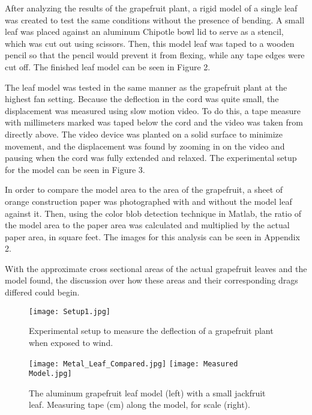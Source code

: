 	After analyzing the results of the grapefruit plant, a rigid model of a single leaf was created to test the same conditions without the presence of bending. A small leaf was placed against an aluminum Chipotle bowl lid to serve as a stencil, which was cut out using scissors. Then, this model leaf was taped to a wooden pencil so that the pencil would prevent it from flexing, while any tape edges were cut off. The finished leaf model can be seen in 
Figure 2.

	The leaf model was tested in the same manner as the grapefruit plant at the highest fan setting. Because the deflection in the cord was quite small, the displacement was measured using slow motion video. To do this, a tape measure with millimeters marked was taped below the cord and the video was taken from directly above. The video device was planted on a solid surface to minimize movement, and the displacement was found by zooming in on the video and pausing when the cord was fully extended and relaxed. The experimental setup for the model can be seen in Figure 3.

	In order to compare the model area to the area of the grapefruit, a sheet of orange construction paper was photographed with and without the model leaf against it. Then, using the color blob detection technique in Matlab, the ratio of the model area to the paper area was calculated and multiplied by the actual paper area, in square feet. The images for this analysis can be seen in Appendix 2.

	With the approximate cross sectional areas of the actual grapefruit leaves and the model found, the discussion over how these areas and their corresponding drags differed could begin.


\begin{figure}
\begin{center}
\texttt{[image: Setup1.jpg]} 
\end{center}
\caption{Experimental setup to measure the deflection of a grapefruit plant when exposed to wind.}
\label{fig:methods1}
\end{figure}

\begin{figure}
\begin{center}
\texttt{[image: Metal\_Leaf\_Compared.jpg]}
\texttt{[image: Measured Model.jpg]}
\end{center}
\caption{The aluminum grapefruit leaf model (left) with a small jackfruit leaf. Measuring tape (cm) along the model, for scale (right).}
\label{fig:methods2}
\end{figure}

